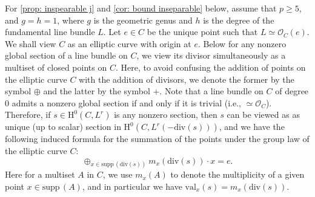 \documentclass[11pt, letterpaper]{amsart}
\theoremstyle{plain}
\theoremstyle{definition}
\newcommand{\supp}{\mathrm{supp \,}}
\newcommand{\<}{\langle}
\renewcommand{\>}{\rangle}
\newcommand{\sO}{\mathcal{O}}
\renewcommand{\H}{\mathrm{H}}
\renewcommand{\div}{\mathrm{div}}
\newcommand{\val}{\mathrm{val}}
\begin{document}
For \cref{prop: inspearable j} and \cref{cor: bound inseparable} below, assume that $p \ge 5$, and $g = h = 1$, where $g$ is the geometric genus and $h$ is the degree of the fundamental line bundle $L$. 
Let $e \in C$ be the unique point such that $L \simeq \sO_C(e)$. 
We shall view $C$ as an elliptic curve with origin at $e$.
Below for any nonzero global section of a line bundle on $C$, we view its divisor simultaneously as a multiset of closed points on $C$. 
Here, to avoid confusing the addition of points on the elliptic curve $C$ with the addition of divisors, we denote the former by the symbol $\oplus$ and the latter by the symbol $+$.
Note that a line bundle on $C$ of degree $0$ admits a nonzero global section if and only if it is trivial (i.e., $\simeq \sO_C$). 
Therefore, if $s \in \H^0(C, L^r)$ is any nonzero section, then $s$ can be viewed as as unique (up to scalar) section in $\H^0(C, L^r(-\mathrm{div}(s)))$, and we have the following induced formula for the summation of the points under the group law of the elliptic curve $C$:
\begin{equation}
    \label{eqn: sum to zero}
    \oplus_{x \in \supp(\mathrm{div}(s))} m_x(\div(s)) \cdot x = e.
\end{equation}
Here for a multiset $A$ in $C$, we use $m_x(A)$ to denote the multiplicity of a given point $x \in \supp(A)$, and in particular we have $\val_x(s) = m_x(\div(s))$. 
\end{document}
